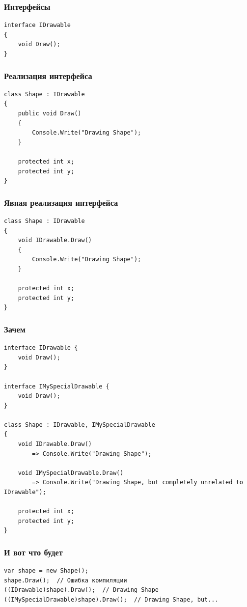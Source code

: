 \documentclass[xetex,mathserif,serif]{beamer}
\begin{document}
    \begin{frame}[fragile]
        \frametitle{Интерфейсы}
        \begin{verbatim}
interface IDrawable
{
    void Draw();
}
        \end{verbatim}
    \end{frame}

    \begin{frame}[fragile]
        \frametitle{Реализация интерфейса}
        \begin{verbatim}
class Shape : IDrawable
{
    public void Draw()
    {
        Console.Write("Drawing Shape");
    }

    protected int x;
    protected int y;
}
        \end{verbatim}
    \end{frame}

    \begin{frame}[fragile]
        \frametitle{Явная реализация интерфейса}
        \begin{verbatim}
class Shape : IDrawable
{
    void IDrawable.Draw()
    {
        Console.Write("Drawing Shape");
    }

    protected int x;
    protected int y;
}
        \end{verbatim}
    \end{frame}

    \begin{frame}[fragile]
        \frametitle{Зачем}
        \begin{footnotesize}
            \begin{verbatim}
interface IDrawable {
    void Draw();
}

interface IMySpecialDrawable {
    void Draw();
}

class Shape : IDrawable, IMySpecialDrawable
{
    void IDrawable.Draw()
        => Console.Write("Drawing Shape");

    void IMySpecialDrawable.Draw()
        => Console.Write("Drawing Shape, but completely unrelated to IDrawable");

    protected int x;
    protected int y;
}
            \end{verbatim}
        \end{footnotesize}
    \end{frame}

    \begin{frame}[fragile]
        \frametitle{И вот что будет}
        \begin{verbatim}
var shape = new Shape();
shape.Draw();  // Ошибка компиляции
((IDrawable)shape).Draw();  // Drawing Shape
((IMySpecialDrawable)shape).Draw();  // Drawing Shape, but...
        \end{verbatim}
    \end{frame}
\end{document}
